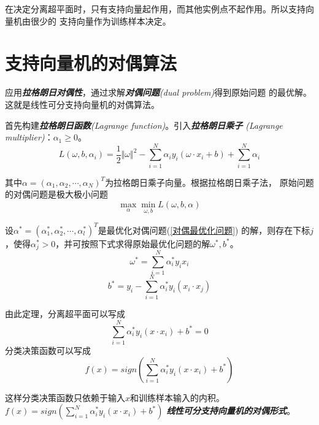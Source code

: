 在决定分离超平面时，只有支持向量起作用，而其他实例点不起作用。所以支持向量机由很少的
支持向量作为训练样本决定。

\section{支持向量机的对偶算法}

应用\textsl{\textbf{拉格朗日对偶性}}，通过求解\textsl{\textbf{对偶问题}(dual problem)}得到原始问题
的最优解。这就是线性可分支持向量机的对偶算法。

首先构建\textsl{\textbf{拉格朗日函数}(Lagrange function)}。引入\textsl{\textbf{拉格朗日乘子}
(Lagrange multiplier)}：$\alpha_1\geqslant 0$。
\begin{equation}
    L(\omega,b,\alpha_i)=\frac{1}{2}\Vert\omega\Vert^2-\sum\limits_{i=1}^{N}\alpha_i
    y_i(\omega\cdot x_i+b)+\sum\limits_{i=1}^{N}\alpha_i
\end{equation}

其中$\alpha=(\alpha_1,\alpha_2,\cdots,\alpha_N)^T$为拉格朗日乘子向量。根据拉格朗日乘子法，
原始问题的对偶问题是极大极小问题
\begin{equation}
    \max\limits_{\alpha}\min\limits_{\omega,b}L(\omega,b,\alpha)
    \label{对偶最优化问题}
\end{equation}

\begin{theorem}
    设$\alpha^*=(\alpha^*_1,\alpha^*_2,\cdots,\alpha^*_l)^T$是最优化对偶问题(\ref{对偶最优化问题})
    的解，则存在下标$j$，使得$\alpha^*_j>0$，并可按照下式求得原始最优化问题的解$\omega^*,b^*$。
    \begin{equation}
        \omega^*=\sum\limits_{i=1}^{N}\alpha^*_iy_ix_i
    \end{equation}
    \begin{equation}
        b^*=y_i-\sum\limits_{i=1}^{N}\alpha^*_iy_i(x_i\cdot x_j)
    \end{equation}
\end{theorem}

由此定理，分离超平面可以写成
\begin{equation}
    \sum\limits_{i=1}^{N}\alpha^*_iy_i(x\cdot x_i)+b^*=0
\end{equation}
分类决策函数可以写成
\begin{equation}
    f(x)=sign(\sum\limits_{i=1}^{N}\alpha^*_iy_i(x\cdot x_i)+b^*)
\end{equation}

这样分类决策函数只依赖于输入$x$和训练样本输入的内积。$f(x)=sign(\sum\limits_{i=1}^{N}\alpha^*_iy_i(x\cdot x_i)+b^*)$
\textsl{\textbf{线性可分支持向量机的对偶形式}}。

